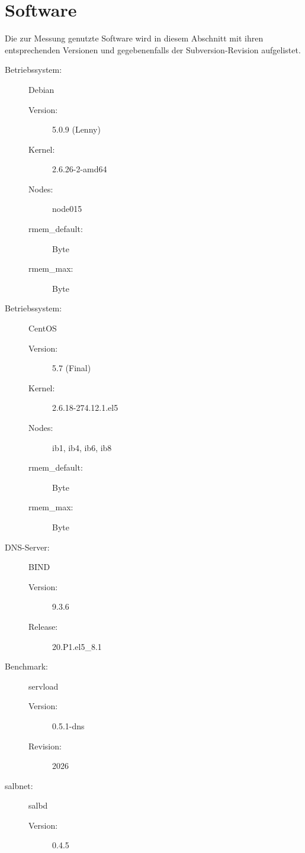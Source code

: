 \documentclass[a4paper, 12pt, BCOR10mm, DIV12, toc=bibliography, toc=listof, german]{scrbook}
\begin{document}

		\section{Software} %
		\label{sec:software}

		Die zur Messung genutzte Software wird in diesem Abschnitt mit ihren entsprechenden Versionen
		und gegebenenfalls der Subversion-Revision aufgelistet.

		\begin{description}
			\item[Betriebssystem:] Debian
				\begin{description}
					\item[Version:] 5.0.9 (Lenny)
					\item[Kernel:] 2.6.26-2-amd64
					\item[Nodes:] node015
					\item[rmem\_default:] \unit[124928]{Byte}
					\item[rmem\_max:] \unit[16777216]{Byte}
				\end{description}
			\item[Betriebssystem:] CentOS
				\begin{description}
					\item[Version:] 5.7 (Final)
					\item[Kernel:] 2.6.18-274.12.1.el5
					\item[Nodes:] ib1, ib4, ib6, ib8
					\item[rmem\_default:] \unit[25165824]{Byte}
					\item[rmem\_max:] \unit[25165824]{Byte}
				\end{description}
			\item[DNS-Server:] BIND
				\begin{description}
					\item[Version:] 9.3.6
					\item[Release:] 20.P1.el5\_8.1
				\end{description}
			\item[Benchmark:] servload
				\begin{description}
					\item[Version:] 0.5.1-dns
					\item[Revision:] 2026
				\end{description}
			\item[salbnet:] salbd
				\begin{description}
					\item[Version:] 0.4.5

\end{description}
\end{description}
\end{document}
